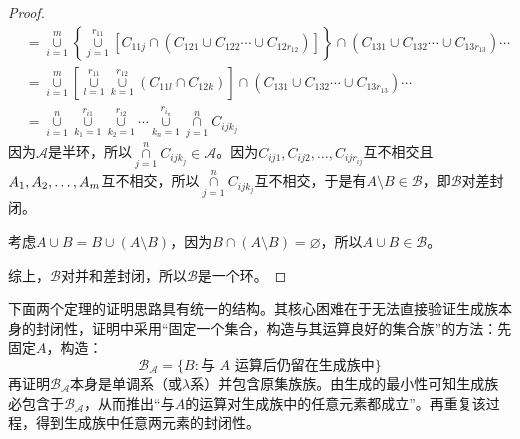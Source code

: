 \begin{proof}
\begin{align*}
		&=\underset{i=1}{\overset{m}{\cup}}\left\{\underset{j=1}{\overset{r_{11}}{\cup}}[C_{11j}\cap(C_{121}\cup C_{122}\cdots\cup C_{12r_{12}})]\right\}\cap(C_{131}\cup C_{132}\cdots\cup C_{13r_{13}})\cdots \\
		&=\underset{i=1}{\overset{m}{\cup}}\left[\underset{l=1}{\overset{r_{11}}{\cup}}\underset{k=1}{\overset{r_{12}}{\cup}}(C_{11l}\cap C_{12k})\right]\cap(C_{131}\cup C_{132}\cdots\cup C_{13r_{13}})\cdots \\
		&=\underset{i=1}{\overset{n}{\cup}}\underset{k_1=1}{\overset{r_{i1}}{\cup}}\underset{k_2=1}{\overset{r_{i2}}{\cup}}\cdots\underset{k_n=1}{\overset{r_{i_n}}{\cup}}\underset{j=1}{\overset{n}{\cap}}C_{ijk_j}
	\end{align*}
	因为$\mathscr{A}$是半环，所以$\underset{j=1}{\overset{n}{\cap}}C_{ijk_j}\in\mathscr{A}$。因为$C_{ij1},C_{ij2},\dots,C_{ijr_{ij}}$互不相交且$A_1, A_2, \dots, A_{m}$互不相交，所以$\underset{j=1}{\overset{n}{\cap}}C_{ijk_j}$互不相交，于是有$A\setminus B\in\mathscr{B}$，即$\mathscr{B}$对差封闭。\par
	考虑$A\cup B=B\cup(A\setminus B)$，因为$B\cap (A\setminus B)=\varnothing$，所以$A\cup B\in\mathscr{B}$。\par
	综上，$\mathscr{B}$对并和差封闭，所以$\mathscr{B}$是一个环。
\end{proof}
\begin{note}
	下面两个定理的证明思路具有统一的结构。其核心困难在于无法直接验证生成族本身的封闭性，证明中采用“固定一个集合，构造与其运算良好的集合族”的方法：先固定$A$，构造：
	\begin{equation*}
		\mathscr{B_A}=\{B:\text{与 }A\text{ 运算后仍留在生成族中}\}
	\end{equation*}
	再证明$\mathscr{B_A}$本身是单调系（或$\lambda$系）并包含原集族族。由生成的最小性可知生成族必包含于$\mathscr{B_A}$，从而推出“与$A$的运算对生成族中的任意元素都成立”。再重复该过程，得到生成族中任意两元素的封闭性。
\end{note}

